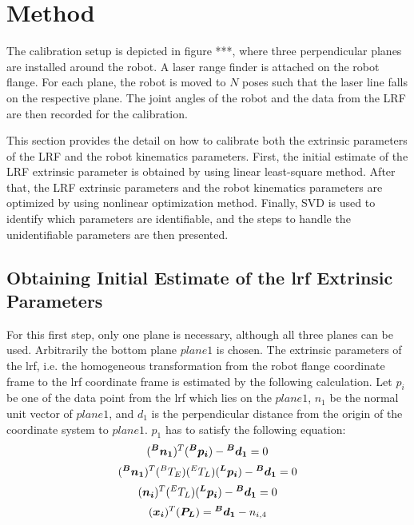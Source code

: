 \section{Method}
\label{sec:method}

The calibration setup is depicted in figure ***, where three perpendicular planes are installed around the robot. A laser range finder is attached on the robot flange. For each plane, the robot is moved to $N$ poses such that the laser line falls on the respective plane. The joint angles of the robot and the data from the LRF are then recorded for the calibration. 

This section provides the detail on how to calibrate both the extrinsic parameters of the LRF and the robot kinematics parameters. First, the initial estimate of the LRF extrinsic parameter is obtained by using linear least-square method. After that, the LRF extrinsic parameters and the robot kinematics parameters are optimized by using nonlinear optimization method. 
Finally, SVD is used to identify which parameters are identifiable, and the steps to handle the unidentifiable parameters are then presented. 
\subsection{Obtaining Initial Estimate of the \ac{lrf} Extrinsic Parameters}
\label{sec:first_step}
For this first step, only one plane is necessary, although all three planes can be used. Arbitrarily the bottom plane $plane 1$ is chosen. The extrinsic parameters of the \ac{lrf}, i.e. the homogeneous transformation from the robot flange coordinate frame to the \ac{lrf} coordinate frame is estimated by the following calculation. 
Let $p_i$ be one of the data point from the \ac{lrf} which lies on the $plane 1$, $n_1$ be the normal unit vector of $plane 1$, and $d_1$ is the perpendicular distance from the origin of the coordinate system to $plane 1$. $p_1$ has to satisfy the following equation:
  \begin{equation*}
  (\vb*{{^B}n_1}) ^T (\vb*{{^B}p_i}) - \vb*{{^B}d_1} = 0
   \end{equation*}
  \begin{equation*}
  (\vb*{{^B}n_1}) ^T ({^B}T_E) ({^E}T_L) (\vb*{{^L}p_i}) - \vb*{{^B}d_1} = 0
  \end{equation*}
  \begin{equation*}
  (\vb*{n_i}) ^T ({^E}T_L) (\vb*{{^L}p_i}) - \vb*{{^B}d_1} = 0
  \end{equation*}
  \begin{equation*}
  (\vb*{x_i})  ^T (\vb*{P_L}) = \vb*{{^B}d_1} -  n_{i,4}
  \end{equation*}

